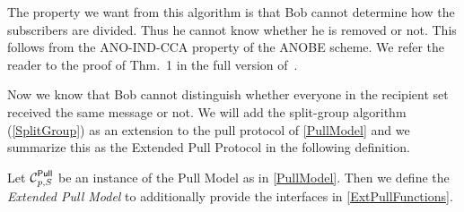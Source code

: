 The property we want from this algorithm is that Bob cannot determine how the 
subscribers are divided.
Thus he cannot know whether he is removed or not.
This follows from the ANO-IND-CCA property of the \ac{ANOBE} scheme.
We refer the reader to the proof of Thm.~1 in the full version of~\cite{ANOBE}.

Now we know that Bob cannot distinguish whether everyone in the recipient set 
received the same message or not.
We will add the split-group algorithm (\cref{SplitGroup}) as an extension to 
the pull protocol of \cref{PullModel} and we summarize this as the Extended 
Pull Protocol in the following definition.

\begin{definition}\label{ExtPullModel}
  Let \(\Pull[p, S]\) be an instance of the Pull Model as in \cref{PullModel}.
  Then we define the \emph{Extended Pull Model} to additionally provide the 
  interfaces in \cref{ExtPullFunctions}.
\end{definition}

